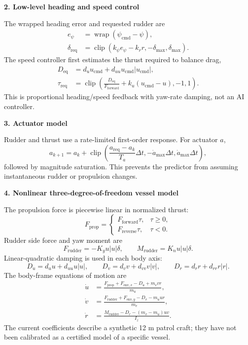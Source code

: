 \documentclass[10pt,a4paper]{article}
\newcommand{\sectionbar}[1]{%
  \vspace{4pt}%
  {\large\bfseries\color{hnavy}#1}\par
  \vspace{-2pt}{\color{hblue}\rule{\textwidth}{0.7pt}}\vspace{2pt}%
}
\begin{document}
\sectionbar{2. Low-level heading and speed control}

The wrapped heading error and requested rudder are
\begin{align}
  e_\psi &= \operatorname{wrap}(\psi_{\mathrm{cmd}}-\psi),\\
  \delta_{\mathrm{req}} &= \operatorname{clip}
  \left(k_\psi e_\psi-k_r r,-\delta_{\max},\delta_{\max}\right).
\end{align}
The speed controller first estimates the thrust required to balance drag,
\begin{align}
  D_{\mathrm{eq}} &= d_u u_{\mathrm{cmd}}+d_{uu}u_{\mathrm{cmd}}|u_{\mathrm{cmd}}|,\\
  \tau_{\mathrm{req}} &= \operatorname{clip}\left(
  \frac{D_{\mathrm{eq}}}{F_{\mathrm{forward}}}
  +k_u(u_{\mathrm{cmd}}-u),-1,1\right).
\end{align}
This is proportional heading/speed feedback with yaw-rate damping, not an AI controller.

\sectionbar{3. Actuator model}

Rudder and thrust use a rate-limited first-order response. For actuator $a$,
\begin{equation}
  a_{k+1}=a_k+\operatorname{clip}\left(
  \frac{a_{\mathrm{req}}-a_k}{T_a}\Delta t,
  -\dot a_{\max}\Delta t,\dot a_{\max}\Delta t\right),
\end{equation}
followed by magnitude saturation. This prevents the predictor from assuming instantaneous rudder or propulsion changes.

\sectionbar{4. Nonlinear three-degree-of-freedom vessel model}

The propulsion force is piecewise linear in normalized thrust:
\begin{equation}
F_{\mathrm{prop}}=
\begin{cases}
F_{\mathrm{forward}}\tau, & \tau\geq 0,\\
F_{\mathrm{reverse}}\tau, & \tau<0.
\end{cases}
\end{equation}
Rudder side force and yaw moment are
\begin{equation}
  F_{\mathrm{rudder}}=-K_yu|u|\delta,
  \qquad M_{\mathrm{rudder}}=K_nu|u|\delta.
\end{equation}
Linear-quadratic damping is used in each body axis:
\begin{equation}
  D_u=d_u u+d_{uu}u|u|,\qquad
  D_v=d_v v+d_{vv}v|v|,\qquad
  D_r=d_r r+d_{rr}r|r|.
\end{equation}
The body-frame equations of motion are
\begin{align}
  \dot u &= \frac{F_{\mathrm{prop}}+F_{\mathrm{env},x}-D_u+m_vvr}{m_u},\\
  \dot v &= \frac{F_{\mathrm{rudder}}+F_{\mathrm{env},y}-D_v-m_uur}{m_v},\\
  \dot r &= \frac{M_{\mathrm{rudder}}-D_r-(m_v-m_u)uv}{I_z}.
\end{align}
The current coefficients describe a synthetic 12 m patrol craft; they have not been calibrated as a certified model of a specific vessel.
\end{document}

